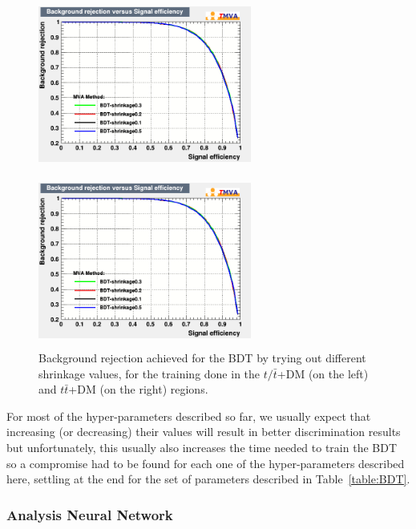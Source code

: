 \documentclass[a4paper, 10pt, openright]{report}
\begin{document}
\begin{appendices}
\begin{figure}[htbp]
\centering
\begin{minipage}[b]{.48\textwidth}
\includegraphics[width=7cm, height=5.7cm]{figs/BDT_shrinkage_ST.png}
\end{minipage}\hfill
\begin{minipage}[b]{.48\textwidth}
\includegraphics[width=7cm, height=5.7cm]{figs/BDT_shrinkage_TTbar.png}
\end{minipage} \hfill
\caption{Background rejection achieved for the \ac{BDT} by trying out different shrinkage values, for the training done in the $t/ \bar t$+DM (on the left) and $t \bar t$+DM (on the right) regions.}
\label{fig:optShrinkage}
\end{figure}

For most of the hyper-parameters described so far, we usually expect that increasing (or decreasing) their values will result in better discrimination results but unfortunately, this usually also increases the time needed to train the \ac{BDT} so a compromise had to be found for each one of the hyper-parameters described here, settling at the end for the set of parameters described in Table~\ref{table:BDT}.

\subsubsection{Analysis Neural Network}


\end{appendices}
\end{document}
